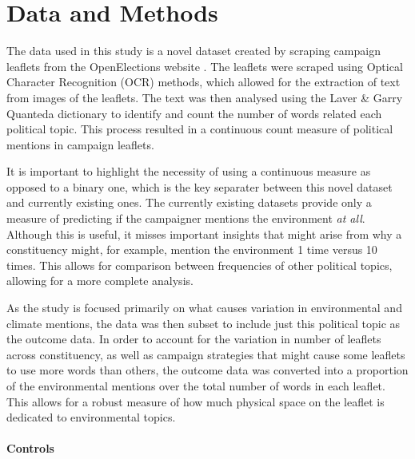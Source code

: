 \documentclass[preprint,12pt,authoryear]{elsarticle}
\begin{document}
	
\section{Data and Methods}


The data used in this study is a novel dataset created by scraping campaign leaflets from the OpenElections website \citep{milazzo2020openelections}. The leaflets were scraped using Optical Character Recognition (OCR) methods, which allowed for the extraction of text from images of the leaflets. The text was then analysed using the Laver \& Garry Quanteda dictionary \citep{laverEstimatingPolicyPositions2000} to identify and count the number of words related each political topic. This process resulted in a continuous count measure of political mentions in campaign leaflets.

It is important to highlight the necessity of using a continuous measure as opposed to a binary one, which is the key separater between this novel dataset and currently existing ones. The currently existing datasets provide only a measure of predicting if the campaigner mentions the environment \textit{at all}. Although this is useful, it misses important insights that might arise from why a constituency might, for example, mention the environment 1 time versus 10 times. This allows for comparison between frequencies of other political topics, allowing for a more complete analysis.

As the study is focused primarily on what causes variation in environmental and climate mentions, the data was then subset to include just this political topic as the outcome data. In order to account for the variation in number of leaflets across constituency, as well as campaign strategies that might cause some leaflets to use more words than others, the outcome data was converted into a proportion of the environmental mentions over the total number of words in each leaflet. This allows for a robust measure  of how much physical space on the leaflet is dedicated to environmental topics.



\paragraph{Controls}
\end{document}
